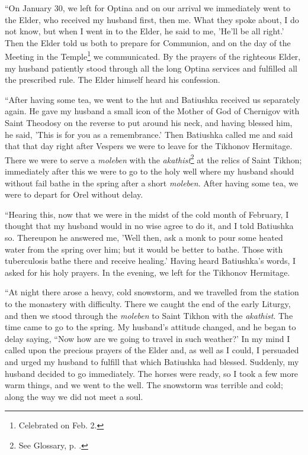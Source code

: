 “On January 30, we left for Optina and on our arrival we immediately went to the Elder, who received my husband first, then me. What they spoke about, I do not know, but when I went in to the Elder, he said to me, 'He'll be all right.' Then the Elder told us both to prepare for Communion, and on the day of the Meeting in the Temple\footnote{Celebrated on Feb. 2.} we communicated. By the prayers of the righteous Elder, my husband patiently stood through all the long Optina services and fulfilled all the prescribed rule. The Elder himself heard his confession.

“After having some tea, we went to the hut and Batiushka received us separately again. He gave my husband a small icon of the Mother of God of Chernigov with Saint Theodosy on the reverse to put around his neck, and having blessed him, he said, 'This is for you as a remembrance.' Then Batiushka called me and said that that day right after Vespers we were to leave for the Tikhonov Hermitage. There we were to serve a \textit{moleben} with the \textit{akathist}\footnote{See Glossary, p. \pageref{akathist}.} at the relics of Saint Tikhon; immediately after this we were to go to the holy well where my husband should without fail bathe in the spring after a short \textit{moleben}. After having some tea, we were to depart for Orel without delay.

“Hearing this, now that we were in the midst of the cold month of February, I thought that my husband would in no wise agree to do it, and I told Batiushka so. Thereupon he answered me, 'Well then, ask a monk to pour some heated water from the spring over him; but it would be better to bathe. Those with tuberculosis bathe there and receive healing.' Having heard Batiushka's words, I asked for his holy prayers. In the evening, we left for the Tikhonov Hermitage.

“At night there arose a heavy, cold snowstorm, and we travelled from the station to the monastery with difficulty. There we caught the end of the early Liturgy, and then we stood through the \textit{moleben} to Saint Tikhon with the \textit{akathist}. The time came to go to the spring. My husband's attitude changed, and he began to delay saying, “Now how are we going to travel in such weather?' In my mind I called upon the precious prayers of the Elder and, as well as I could, I persuaded and urged my husband to fulfill that which Batiushka had blessed. Suddenly, my husband decided to go immediately. The horses were ready, so I took a few more warm things, and we went to the well. The snowstorm was terrible and cold; along the way we did not meet a soul.

